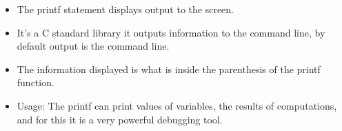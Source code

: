 \begin{itemize}
    \item The printf statement displays output to the screen.
    \item It's a C standard library it outputs information to the command line, by default output is the command line.
    \item The information displayed is what is inside the parenthesis of the printf function.
    \item Usage: The printf can print values of variables, the results of computations, and for this it is a very powerful debugging tool.
\end{itemize}
